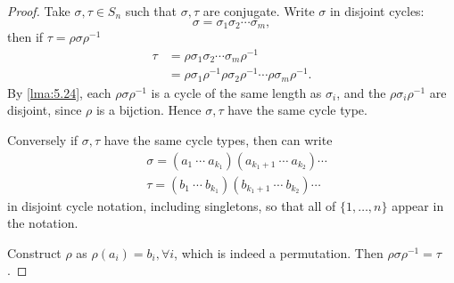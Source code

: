 \documentclass[a4paper]{article}
\begin{document}
\begin{proof}
  Take $ \sigma, \tau\in S_n $ such that $ \sigma, \tau $ are
  conjugate. Write $ \sigma $ in disjoint cycles:
  \[
    \sigma=\sigma_1\sigma_2\cdots \sigma_m
  ,\]
  then if $ \tau=\rho\sigma\rho^{-1} $
  \[
    \begin{aligned}
      \tau&=\rho\sigma_1\sigma_2\cdots \sigma_m\rho^{-1}\\
      &= \rho\sigma_1\rho^{-1}\rho\sigma_2\rho^{-1}\cdots \rho\sigma_m\rho^{-1}.
    \end{aligned}
  \]
  By \ref{lma:5.24}, each $ \rho\sigma\rho^{-1} $ is a cycle of the
  same length as $\sigma_i$, and the $ \rho\sigma_i\rho^{-1} $ are
  disjoint, since $\rho$ is a bijction. Hence $ \sigma,\tau $ have
  the same cycle type.

  Conversely if $\sigma,\tau$ have the same cycle types, then can write
  \[
    \begin{aligned}
      &\sigma= (a_1\ \cdots\ a_{k_1})(a_{k_1+1}\ \cdots\ a_{k_2})\cdots\\
      &\tau = (b_1\ \cdots\ b_{k_1})(b_{k_1+1}\ \cdots\ b_{k_2})\cdots
    \end{aligned}
  \]
  in disjoint cycle notation, including singletons, so that all of
  $\{1,\dots,n\}$ appear in the notation.

  Construct $ \rho $ as $ \rho(a_i)=b_i, \forall i$, which is indeed
  a permutation. Then $ \rho\sigma\rho^{-1}=\tau $.
\end{proof}
\end{document}
